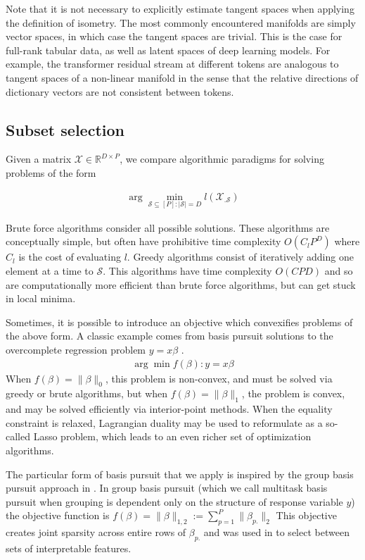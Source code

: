 Note that it is not necessary to explicitly estimate tangent spaces when applying the definition of isometry.
The most commonly encountered manifolds are simply vector spaces, in which case the tangent spaces are trivial.
This is the case for full-rank tabular data, as well as latent spaces of deep learning models.
For example, the transformer residual stream at different tokens are analogous to tangent spaces of a non-linear manifold in the sense that the relative directions of dictionary vectors are not consistent between tokens.

\subsection{Subset selection}

Given a matrix $\mathcal X \in \mathbb R^{D \times P}$, we compare algorithmic paradigms for solving problems of the form

\begin{align}
\label{prog:ground_truth}
\arg \min_{\mathcal S \subseteq [P] : |\mathcal S| = D} l (\mathcal X_{.\mathcal S})
\end{align}

Brute force algorithms consider all possible solutions.
These algorithms are conceptually simple, but often have prohibitive time complexity $O(C_lP^D)$ where $C_l$ is the cost of evaluating $l$.
Greedy algorithms consist of iteratively adding one element at a time to $\mathcal S$.
This algorithms have time complexity $O(CPD)$ and so are computationally more efficient than brute force algorithms, but can get stuck in local minima.

Sometimes, it is possible to introduce an objective which convexifies problems of the above form.
A classic example comes from basis pursuit solutions to the overcomplete regression problem $y = x\beta$ \cite{Chen2001-hh}.
\begin{align}
\arg \min f (\beta) : y  = x\beta 
\end{align}
When $f(\beta) = \|\beta\|_0$, this problem is non-convex, and must be solved via greedy or brute algorithms, but when $f(\beta) =\|\beta\|_1$, the problem is convex, and may be solved efficiently via interior-point methods.
When the equality constraint is relaxed, Lagrangian duality may be used to reformulate as a so-called Lasso problem, which leads to an even richer set of optimization algorithms. %


The particular form of basis pursuit that we apply is inspired by the group basis pursuit approach in \citet{Koelle2022-ju}.
In group basis pursuit (which we call multitask basis pursuit when grouping is dependent only on the structure of response variable $y$) the objective function is $f(\beta) = \|\beta\|_{1,2} := \sum_{p=1}^P \|\beta_{p.}\|_2$  \citep{Yuan2006-bt, Obozinski2006-kq, Yeung2011-fg}
This objective creates joint sparsity across entire rows of $\beta_{p.}$ and was used in \citep{Koelle2022-ju} to select between sets of interpretable features.
